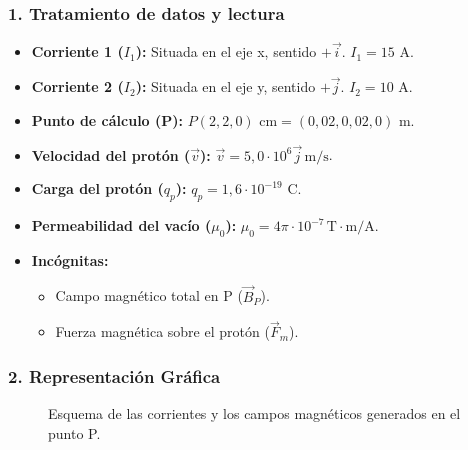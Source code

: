 \subsubsection*{1. Tratamiento de datos y lectura}
\begin{itemize}
    \item \textbf{Corriente 1 ($I_1$):} Situada en el eje x, sentido $+\vec{i}$. $I_1 = 15 \text{ A}$.
    \item \textbf{Corriente 2 ($I_2$):} Situada en el eje y, sentido $+\vec{j}$. $I_2 = 10 \text{ A}$.
    \item \textbf{Punto de cálculo (P):} $P(2,2,0) \text{ cm} = (0,02, 0,02, 0) \text{ m}$.
    \item \textbf{Velocidad del protón ($\vec{v}$):} $\vec{v} = 5,0 \cdot 10^6 \vec{j} \, \text{m/s}$.
    \item \textbf{Carga del protón ($q_p$):} $q_p = 1,6 \cdot 10^{-19} \text{ C}$.
    \item \textbf{Permeabilidad del vacío ($\mu_0$):} $\mu_0 = 4\pi \cdot 10^{-7} \, \text{T}\cdot\text{m/A}$.
    \item \textbf{Incógnitas:}
    \begin{itemize}
        \item Campo magnético total en P ($\vec{B}_P$).
        \item Fuerza magnética sobre el protón ($\vec{F}_m$).
    \end{itemize}
\end{itemize}

\subsubsection*{2. Representación Gráfica}
\begin{figure}[H]
    \centering
    \caption{Esquema de las corrientes y los campos magnéticos generados en el punto P.}
\end{figure}

